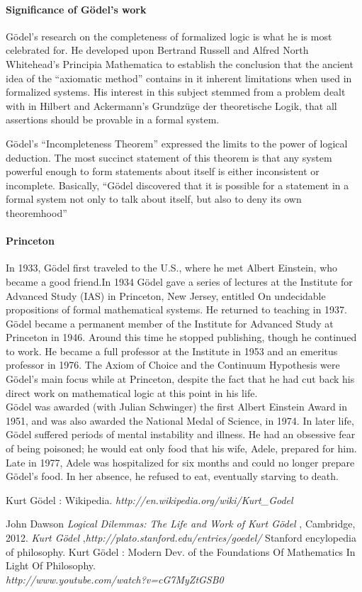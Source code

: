 \documentclass[12pt]{article}
\newcommand{\kg}{Kurt G{\"o}del }
\newcommand{\gd}{G{\"o}del }
\newcommand{\gds}{G{\"o}del's }
\begin{document}
 \paragraph{Significance of \gds work}
 \gds research on the completeness of formalized logic is what he is most celebrated for.  He developed upon Bertrand Russell and Alfred North Whitehead’s Principia Mathematica to establish the conclusion that the ancient idea of the ``axiomatic method'' contains in it inherent limitations when used in formalized systems.  His interest in this subject stemmed from a problem dealt with in Hilbert and Ackermann’s Grundz{\"u}ge der theoretische Logik, that all assertions should be provable in a formal system. 

 \gds ``Incompleteness Theorem'' expressed the limits to the power of logical deduction.  The most succinct statement of this theorem is that any system powerful enough to form statements about itself is either inconsistent or incomplete. 
 Basically, “\gd discovered that it is possible for a statement in a formal system not only to talk about itself, but also to deny its own theoremhood”
 \paragraph{Princeton}
 In 1933, \gd first traveled to the U.S., where he met Albert Einstein, who became a good friend.In 1934 \gd gave a series of lectures at the Institute for Advanced Study (IAS) in Princeton, New Jersey, entitled On undecidable propositions of formal mathematical systems. He returned to teaching in 1937. \gd became a permanent member of the Institute for Advanced Study at Princeton in 1946. Around this time he stopped publishing, though he continued to work. He became a full professor at the Institute in 1953 and an emeritus professor in 1976. The Axiom of Choice and the Continuum Hypothesis were \gds main focus while at Princeton, despite the fact that he had cut back his direct work on mathematical logic at this point in his life.\\
 \gd was awarded (with Julian Schwinger) the first Albert Einstein Award in 1951, and was also awarded the National Medal of Science, in 1974.
 In later life, \gd suffered periods of mental instability and illness. He had an obsessive fear of being poisoned; he would eat only food that his wife, Adele, prepared for him. Late in 1977, Adele was hospitalized for six months and could no longer prepare \gds food. In her absence, he refused to eat, eventually starving to death.

\begin{thebibliography}{4}
%
\kg: Wikipedia. \textit{http://en.wikipedia.org/wiki/Kurt\_Godel}

%
John Dawson 
{\emph{Logical Dilemmas: The Life and Work of \kg  }},
Cambridge, 2012.
%
{\emph{\kg  }},\textit{http://plato.stanford.edu/entries/goedel/}
Stanford encylopedia of philosophy.
%
\kg: Modern Dev. of the Foundations Of Mathematics In Light Of Philosophy.\\\textit{http://www.youtube.com/watch?v=cG7MyZtGSB0}

\end{thebibliography}
\end{document}
